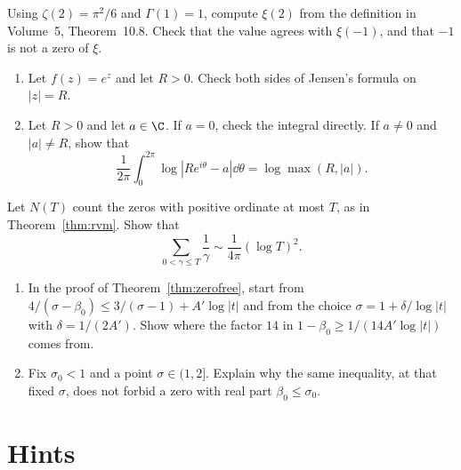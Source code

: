 \begin{exercise}[$\star$]\label{ex:xi2}
Using $\zeta(2)=\pi^2/6$ and $\Gamma(1)=1$, compute $\xi(2)$ from the definition in Volume~5, Theorem~10.8. Check that the value agrees with $\xi(-1)$, and that $-1$ is not a zero of $\xi$.
\end{exercise}

\begin{exercise}[$\star\star$]\label{ex:jensencheck}
\begin{enumerate}[label=(\alph*)]
\item Let $f(z)=e^z$ and let $R>0$. Check both sides of Jensen's formula on $|z|=R$.
\item Let $R>0$ and let $a\in\C$. If $a=0$, check the integral directly. If $a\ne0$ and $|a|\ne R$, show that
\[
\frac1{2\pi}\int_0^{2\pi}\log|Re^{i\theta}-a|\dd\theta=\log\max(R,|a|).
\]
\end{enumerate}
\end{exercise}

\begin{exercise}[$\star\star$]\label{ex:ordsum}
Let $N(T)$ count the zeros with positive ordinate at most $T$, as in Theorem~\ref{thm:rvm}. Show that
\[
\sum_{0<\gamma\le T}\frac1\gamma\sim\frac1{4\pi}(\log T)^2.
\]
\end{exercise}

\begin{exercise}[$\star\star\star$]\label{ex:fourteen}
\begin{enumerate}[label=(\alph*)]
\item In the proof of Theorem~\ref{thm:zerofree}, start from $4/(\sigma-\beta_0)\le3/(\sigma-1)+A'\log|t|$ and from the choice $\sigma=1+\delta/\log|t|$ with $\delta=1/(2A')$. Show where the factor $14$ in $1-\beta_0\ge1/(14A'\log|t|)$ comes from.
\item Fix $\sigma_0<1$ and a point $\sigma\in(1,2]$. Explain why the same inequality, at that fixed $\sigma$, does not forbid a zero with real part $\beta_0\le\sigma_0$.
\end{enumerate}
\end{exercise}

\section{Hints}

